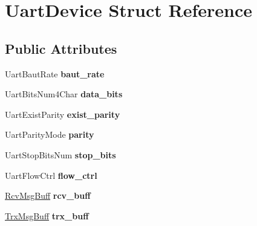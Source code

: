 \hypertarget{struct_uart_device}{}\section{Uart\+Device Struct Reference}
\label{struct_uart_device}
\subsection*{Public Attributes}
\begin{DoxyCompactItemize}
\item 
\hypertarget{struct_uart_device_a1a6982e54a4c80d03248d97aa4e7f57c}{}Uart\+Baut\+Rate {\bfseries baut\+\_\+rate}\label{struct_uart_device_a1a6982e54a4c80d03248d97aa4e7f57c}

\item 
\hypertarget{struct_uart_device_ae8f01df67cbdc9fad5e8b66fd03907d6}{}Uart\+Bits\+Num4\+Char {\bfseries data\+\_\+bits}\label{struct_uart_device_ae8f01df67cbdc9fad5e8b66fd03907d6}

\item 
\hypertarget{struct_uart_device_ab0dbde04e07cf399428582ce9d8bc43d}{}Uart\+Exist\+Parity {\bfseries exist\+\_\+parity}\label{struct_uart_device_ab0dbde04e07cf399428582ce9d8bc43d}

\item 
\hypertarget{struct_uart_device_aaa1f4b3ac8e9a72e0701105ad7d8078e}{}Uart\+Parity\+Mode {\bfseries parity}\label{struct_uart_device_aaa1f4b3ac8e9a72e0701105ad7d8078e}

\item 
\hypertarget{struct_uart_device_a4c196eb55ccaa09061a843bbe47d29dc}{}Uart\+Stop\+Bits\+Num {\bfseries stop\+\_\+bits}\label{struct_uart_device_a4c196eb55ccaa09061a843bbe47d29dc}

\item 
\hypertarget{struct_uart_device_a7d7e4e0d15a906b2f3c6d4d2febc45a2}{}Uart\+Flow\+Ctrl {\bfseries flow\+\_\+ctrl}\label{struct_uart_device_a7d7e4e0d15a906b2f3c6d4d2febc45a2}

\item 
\hypertarget{struct_uart_device_a9daa6a5b871ff1c87427231dff168f41}{}\hyperlink{struct_rcv_msg_buff}{Rcv\+Msg\+Buff} {\bfseries rcv\+\_\+buff}\label{struct_uart_device_a9daa6a5b871ff1c87427231dff168f41}

\item 
\hypertarget{struct_uart_device_ab83762d1f1257fbbc3ba728520fa0231}{}\hyperlink{struct_trx_msg_buff}{Trx\+Msg\+Buff} {\bfseries trx\+\_\+buff}\label{struct_uart_device_ab83762d1f1257fbbc3ba728520fa0231}


\end{DoxyCompactItemize}
